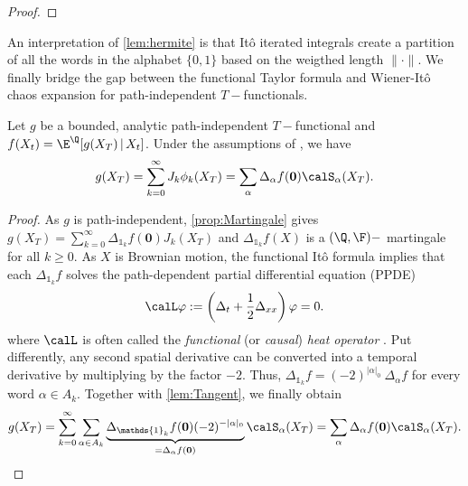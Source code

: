 \begin{proof}
\end{proof}
An interpretation of  \cref{lem:hermite} is that  It\^o iterated integrals create a partition of all the words in the alphabet $\{0,1\}$ based on the weigthed length $\lVert \cdot \rVert$.  
We finally bridge the gap between the functional Taylor formula and Wiener-It\^o chaos expansion for path-independent $T-$functionals. 
\begin{proposition}
Let $g$ be a bounded, analytic path-independent $T-$functional and $f(X_t) = \E^{\Q}[g(X_T)\,|\,X_t]$.  Under the assumptions of  , we have
   \begin{equation*}
       g(X_T) = \sum_{k=0}^{\infty} J_k \phi_k (X_T) = \sum_{\alpha }
   \Delta_{\alpha}f(\boldsymbol{0})    \calS_{\alpha}(X_T).
   \end{equation*}
\end{proposition} 


\begin{proof}
As $g$ is path-independent, 
\cref{prop:Martingale} gives
$
g(X_T) = 
\sum_{k=0}^{\infty}\Delta_{\mathds{1}_k}f(\boldsymbol{0}) J_k(X_T)
$ and  $\Delta_{\mathds{1}_k} f(X)$ is a $(\Q,\F)-$ martingale for all $k\ge 0$. As $X$ is Brownian motion, the functional It\^o formula \cite{Dupire} implies that each $\Delta_{\mathds{1}_k} f$ solves  the path-dependent partial differential equation (PPDE) 
\begin{equation}\label{eq:PPDE}
  \calL \varphi :=  \left(\Delta_t + \frac{1}{2}\Delta_{xx} \right)\varphi=0. 
\end{equation}
where $\calL$ is often called the \textit{functional} (or \textit{causal})  \textit{heat operator} \cite{Oberhauser}. 
Put differently, any second spatial derivative can be converted into a temporal derivative by multiplying by the factor $-2$. Thus,  $\Delta_{\mathds{1}_k}f =  (-2)^{|\alpha|_0} \ \Delta_{\alpha} f$ for every word $\alpha \in A_k$. 
   Together with \cref{lem:Tangent}, we finally obtain 
  \begin{align*}
  g(X_T) 
      = \sum_{k=0}^{\infty} \sum_{\alpha \in A_k} \underbrace{\Delta_{\mathds{1}_k} f(\boldsymbol{0}) (-2)^{-|\alpha|_0} }_{= \Delta_{\alpha} f(\boldsymbol{0})}  \calS_{\alpha}(X_T)
      = \sum_{\alpha} \Delta_{\alpha} f(\boldsymbol{0}) \calS_{\alpha}(X_T). 
  \end{align*}
\end{proof}




